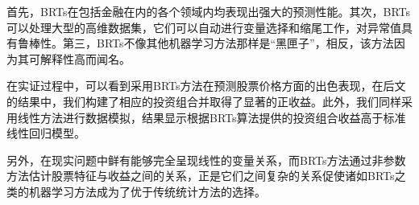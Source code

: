 首先，BRTs在包括金融在内的各个领域内均表现出强大的预测性能。其次，BRTs可以处理大型的高维数据集，它们可以自动进行变量选择和缩尾工作，对异常值具有鲁棒性。第三，BRTs不像其他机器学习方法那样是“黑匣子”，相反，该方法因为其可解释性高而闻名。

在实证过程中，可以看到采用BRTs方法在预测股票价格方面的出色表现，在后文的结果中，我们构建了相应的投资组合并取得了显著的正收益。此外，我们同样采用线性方法进行数据模拟，结果显示根据BRTs算法提供的投资组合收益高于标准线性回归模型。

另外，在现实问题中鲜有能够完全呈现线性的变量关系，而BRTs方法通过非参数方法估计股票特征与收益之间的关系，正是它们之间复杂的关系促使诸如BRTs之类的机器学习方法成为了优于传统统计方法的选择。

%
%
%
%
